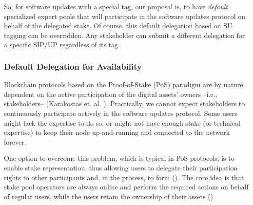 So, for software updates with a special tag, our proposal is, to have \emph{default} specialized expert pools that will participate in the software updates protocol on behalf of the
 delegated stake. Of course, this default delegation based on SU tagging can be overridden. Any stakeholder can submit a different delegation for a specific SIP/UP regardless of its tag.

\subsubsection{Default Delegation for Availability}\label{defaultdel}
Blockchain protocols based on the Proof-of-Stake (PoS) paradigm are by nature dependent on the active participation of the digital assets' owners --i.e., stakeholders-- (Karakostas et. al. \cite{stakepools}). Practically, we cannot expect stakeholders to continuously participate actively in the software updates protocol. Some users might lack the expertise to do so, or might not have enough stake (or technical expertise) to keep their node up-and-running and connected to the network forever.

One option to overcome this problem, which is typical in PoS protocols, is to enable stake representation, thus allowing users to delegate their participation rights to other participants and, in the process, to form
(\cite{stakepools}). The core idea is that stake pool operators are always online and perform
the required actions on behalf of regular users, while the users retain the ownership of their
assets (\cite{stakepools}).

